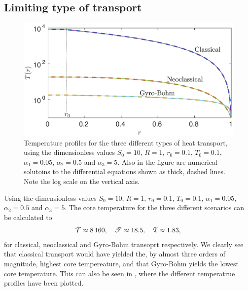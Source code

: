 \documentclass[11pt,a4paper, 
swedish, english %
]{article}
\begin{document}
\subsection*{Limiting type of transport}
\begin{figure}
\centering
\includegraphics[width=12cm]{Q2.eps}
\caption{Temperature profiles for the three different types of heat
  transport, using the dimensionless values $S_0=10$, $R=1$,
  $r_0=0.1$, $T_0=0.1$, $\alpha_1=0.05$, $\alpha_2=0.5$ and
  $\alpha_3=5$. Also in the figure are numerical solutoins to the
  differential equations shown as thick, dashed lines. Note the log
  scale on the vertical axis.}
\label{fig:transp}
\end{figure}

Using the dimensionless values $S_0=10$, $R=1$, $r_0=0.1$, $T_0=0.1$,
$\alpha_1=0.05$, $\alpha_2=0.5$ and $\alpha_3=5$. The core temperature
for the three different scenarios can be calculated to
\begin{equation}
\mathcal{T}\approx8\,160\qc
\mathscr{T}\approx18.5\qc
\mathfrak{T}\approx1.83,
\end{equation}
for classical, neoclassical and Gyro-Bohm transoprt
respectively. We clearly see that classical transport would have
yielded the, by almost three orders of magnitude, highest core
tempereature, and that Gyro-Bohm yields the lowest core
temperature. This can also be seen in , where the
different temperatrue profiles have been plotted. 
\end{document}
